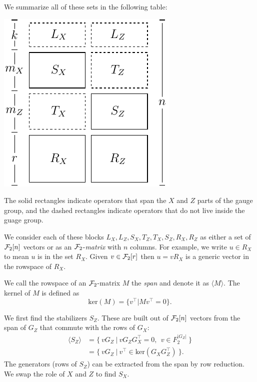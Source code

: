 \documentclass[12pt]{article}
\begin{document}
We summarize all of these sets
in the following table:
\def\Im{\mathrm{im}}
\def\Ker{\mathrm{ker}}
\def\Span#1{\langle #1 \rangle}
\begin{center}
\includegraphics[]{pic-symplectic.pdf}
\end{center}

The solid rectangles indicate operators that
span the $X$ and $Z$ parts of the gauge group,
and the dashed rectangles indicate operators that
do not live inside the guage group.

We consider each of these blocks 
$L_X, L_Z, S_X, T_Z, T_X, S_Z, R_X, R_Z$
as either a set of $\mathcal{F}_2[n]$ vectors or as an 
$\mathcal{F}_2$-\emph{matrix}
with $n$ columns.
For example, we write $u\in R_X$ to mean $u$ is in
the set $R_X$. 
Given $v\in \mathcal{F}_2[r]$ then $u = v R_X$ is
a generic vector in the rowspace of $R_X.$

We call the rowspace of an $\mathcal{F}_2$-matrix
$M$ the \emph{span} and denote 
it as $\Span{M}.$
The kernel of $M$ is defined as
$$
    \Ker(M) = \{ v^\top | M v^\top = 0 \}.
$$

We first find the stabilizers $S_Z$.
These are built out of $\mathcal{F}_2[n]$ vectors from the span of $G_Z$
that commute with the rows of $G_X:$
\begin{align*}
    \Span{S_Z} &= \{\  vG_Z \ |\  v G_Z G_X^\top = 0, \ \ v \in F_2^{|G_Z|}\ \} \\
               &= \{\  vG_Z \ |\  v^\top \in \Ker(G_X G_Z^\top)  \ \}.
\end{align*}
The generators (rows of $S_Z$) can be extracted
from the span by row reduction.
We swap the role of $X$ and $Z$ to find $S_X.$
\end{document}
